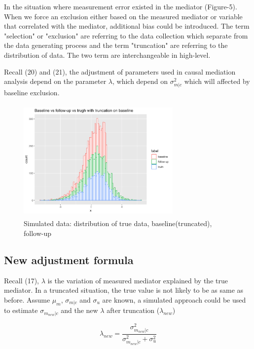 \documentclass{article}
\begin{document}
In the situation where measurement error existed in the mediator (Figure-5). When we force an exclusion either based on the measured mediator or variable that correlated with the mediator, additional bias could be introduced. The term "selection" or "exclusion" are referring to the data collection which separate from the data generating process and the term "truncation" are referring to the distribution of data. The two term are interchangeable in high-level. \

Recall (20) and (21), the adjustment of parameters used in causal mediation analysis depend on the parameter $\lambda$, which depend on $\sigma^2_{m|c}$ which will affected by baseline exclusion. 



\begin{figure}[h]
\centering
\includegraphics[width = 8cm,height = 6cm]{figure-4.png}
\caption{Simulated data: distribution of true data, baseline(truncated), follow-up }
\label{fig4}
\end{figure}



\subsection{New adjustment formula}

Recall (17), $\lambda$ is the variation of measured mediator explained by the true mediator. In a truncated situation, the true value is not likely to be as same as before. Assume $\mu_m $, $\sigma_{m|c}$ and $\sigma_u$ are known, a simulated approach could be used to estimate  $\sigma_{m_{new}|c}$ and the new $\lambda$ after truncation ($\lambda_{new}$)

\begin{equation}
\lambda_{new} = \frac{\sigma_{m_{new}|c}^2}{\sigma_{m_{new}|c}^2 + \sigma_{u}^2}
\end{equation}
\end{document}
